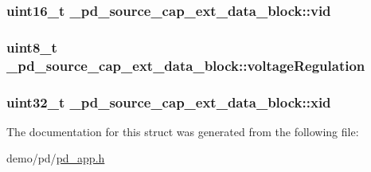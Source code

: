 \hypertarget{struct__pd__source__cap__ext__data__block_a3ebf0b088d638829f685c9e401af51d9}{
\subsubsection[{vid}]{\setlength{\rightskip}{0pt plus 5cm}uint16\-\_\-t \-\_\-pd\-\_\-source\-\_\-cap\-\_\-ext\-\_\-data\-\_\-block\-::vid}}\label{struct__pd__source__cap__ext__data__block_a3ebf0b088d638829f685c9e401af51d9}
\hypertarget{struct__pd__source__cap__ext__data__block_a46bcde86423f903c6f8a4da9bcf51bb6}{
\subsubsection[{voltage\-Regulation}]{\setlength{\rightskip}{0pt plus 5cm}uint8\-\_\-t \-\_\-pd\-\_\-source\-\_\-cap\-\_\-ext\-\_\-data\-\_\-block\-::voltage\-Regulation}}\label{struct__pd__source__cap__ext__data__block_a46bcde86423f903c6f8a4da9bcf51bb6}
\hypertarget{struct__pd__source__cap__ext__data__block_a7422db66b33622addc1c55d9876bd495}{
\subsubsection[{xid}]{\setlength{\rightskip}{0pt plus 5cm}uint32\-\_\-t \-\_\-pd\-\_\-source\-\_\-cap\-\_\-ext\-\_\-data\-\_\-block\-::xid}}\label{struct__pd__source__cap__ext__data__block_a7422db66b33622addc1c55d9876bd495}


The documentation for this struct was generated from the following file\-:\begin{DoxyCompactItemize}
\item 
demo/pd/\hyperlink{pd__app_8h}{pd\-\_\-app.\-h}\end{DoxyCompactItemize}
